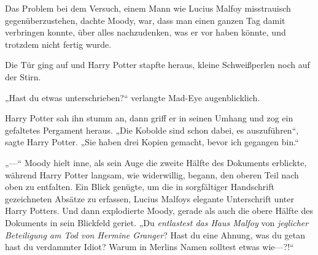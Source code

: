Das Problem bei dem Versuch, einem Mann wie Lucius Malfoy misstrauisch gegenüberzustehen, dachte Moody, war, dass man einen ganzen Tag damit verbringen konnte, über alles nachzudenken, was er vor haben könnte, und trotzdem nicht fertig wurde.

Die Tür ging auf und Harry Potter stapfte heraus, kleine Schweißperlen noch auf der Stirn.

„Hast du etwas unterschrieben?“ verlangte Mad-Eye augenblicklich.

Harry Potter sah ihn stumm an, dann griff er in seinen Umhang und zog ein gefaltetes Pergament heraus. „Die Kobolde sind schon dabei, es auszuführen“, sagte Harry Potter. „Sie haben drei Kopien gemacht, bevor ich gegangen bin.“

„—“
Moody hielt inne, als sein Auge die zweite Hälfte des Dokuments erblickte, während Harry Potter langsam, wie widerwillig, begann, den oberen Teil nach oben zu entfalten. Ein Blick genügte, um die in sorgfältiger Handschrift gezeichneten Absätze zu erfassen, Lucius Malfoys elegante Unterschrift unter Harry Potters. Und dann explodierte Moody, gerade als auch die obere Hälfte des Dokuments in sein Blickfeld geriet.
„Du \emph{entlastest das Haus Malfoy} von \emph{jeglicher Beteiligung am Tod von Hermine Granger}? Hast du eine Ahnung, was du getan hast du verdammter Idiot? Warum in Merlins Namen solltest etwas wie—?!“

